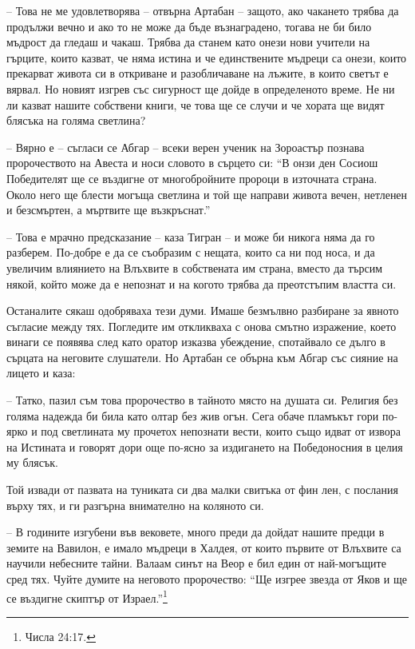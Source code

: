 -- Това не ме удовлетворява -- отвърна Артабан -- защото, ако чакането трябва да
продължи вечно и ако то не може да бъде възнаградено, тогава не би било мъдрост
да гледаш и чакаш. Трябва да станем като онези нови учители на гърците, които
казват, че няма истина и че единствените мъдреци са онези, които прекарват
живота си в откриване и разобличаване на лъжите, в които светът е вярвал. Но
новият изгрев със сигурност ще дойде в определеното време. Не ни ли казват
нашите собствени книги, че това ще се случи и че хората ще видят блясъка на
голяма светлина?

-- Вярно е -- съгласи се Абгар -- всеки верен ученик на Зороастър познава
пророчеството на Авеста и носи словото в сърцето си: ``В онзи ден Сосиош
Победителят ще се въздигне от многобройните пророци в източната страна. Около
него ще блести могъща светлина и той ще направи живота вечен, нетленен и
безсмъртен, а мъртвите ще възкръснат.''

-- Това е мрачно предсказание -- каза Тигран -- и може би никога няма да го
разберем. По-добре е да се съобразим с нещата, които са ни под носа, и да
увеличим влиянието на Влъхвите в собствената им страна, вместо да търсим някой,
който може да е непознат и на когото трябва да преотстъпим властта си.

Останалите сякаш одобряваха тези думи. Имаше безмълвно разбиране за явното
съгласие между тях. Погледите им откликваха с онова смътно изражение, което
винаги се появява след като оратор изказва убеждение, спотайвало се дълго в
сърцата на неговите слушатели. Но Артабан се обърна към Абгар със сияние на
лицето и каза:

-- Татко, пазил съм това пророчество в тайното място на душата си. Религия без
голяма надежда би била като олтар без жив огън. Сега обаче пламъкът гори по-ярко
и под светлината му прочетох непознати вести, които също идват от извора на
Истината и говорят дори още по-ясно за издигането на Победоносния в целия му
блясък.

Той извади от пазвата на туниката си два малки свитъка от фин лен, с послания
върху тях, и ги разгърна внимателно на коляното си.

-- В годините изгубени във вековете, много преди да дойдат нашите предци в
земите на Вавилон, е имало мъдреци в Халдея, от които първите от Влъхвите са
научили небесните тайни. Валаам синът на Веор е бил един от най-могъщите сред
тях. Чуйте думите на неговото пророчество: ``Ще изгрее звезда от Яков и ще се
въздигне скиптър от Израел.''\footnote{Числа 24:17.}

